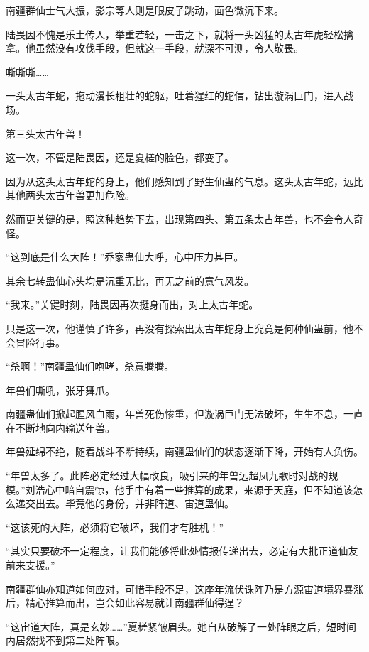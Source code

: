 
\begin{this_body}



南疆群仙士气大振，影宗等人则是眼皮子跳动，面色微沉下来。

陆畏因不愧是乐土传人，举重若轻，一击之下，就将一头凶猛的太古年虎轻松擒拿。他虽然没有攻伐手段，但就这一手段，就深不可测，令人敬畏。

嘶嘶嘶……

一头太古年蛇，拖动漫长粗壮的蛇躯，吐着猩红的蛇信，钻出漩涡巨门，进入战场。

第三头太古年兽！

这一次，不管是陆畏因，还是夏槎的脸色，都变了。

因为从这头太古年蛇的身上，他们感知到了野生仙蛊的气息。这头太古年蛇，远比其他两头太古年兽更加危险。

然而更关键的是，照这种趋势下去，出现第四头、第五条太古年兽，也不会令人奇怪。

“这到底是什么大阵！”乔家蛊仙大呼，心中压力甚巨。

其余七转蛊仙心头均是沉重无比，再无之前的意气风发。

“我来。”关键时刻，陆畏因再次挺身而出，对上太古年蛇。

只是这一次，他谨慎了许多，再没有探索出太古年蛇身上究竟是何种仙蛊前，他不会冒险行事。

“杀啊！”南疆蛊仙们咆哮，杀意腾腾。

年兽们嘶吼，张牙舞爪。

南疆蛊仙们掀起腥风血雨，年兽死伤惨重，但漩涡巨门无法破坏，生生不息，一直在不断地向内输送年兽。

年兽延绵不绝，随着战斗不断持续，南疆蛊仙们的状态逐渐下降，开始有人负伤。

“年兽太多了。此阵必定经过大幅改良，吸引来的年兽远超凤九歌时对战的规模。”刘浩心中暗自震惊，他手中有着一些推算的成果，来源于天庭，但不知道该怎么递交出去。毕竟他的身份，并非阵道、宙道蛊仙。

“这该死的大阵，必须将它破坏，我们才有胜机！”

“其实只要破坏一定程度，让我们能够将此处情报传递出去，必定有大批正道仙友前来支援。”

南疆群仙亦知道如何应对，可惜手段不足，这座年流伏诛阵乃是方源宙道境界暴涨后，精心推算而出，岂会如此容易就让南疆群仙得逞？

“这宙道大阵，真是玄妙……”夏槎紧皱眉头。她自从破解了一处阵眼之后，短时间内居然找不到第二处阵眼。


\end{this_body}
